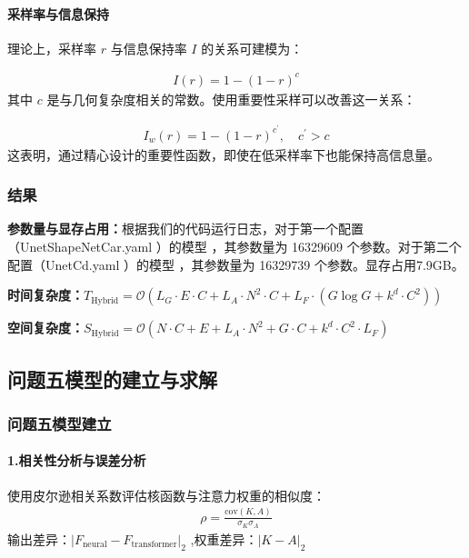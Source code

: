 \documentclass{MMCStyle}
\begin{document}
    
        \paragraph{采样率与信息保持}

理论上，采样率 $r$ 与信息保持率 $I$ 的关系可建模为：  


    \begin{eqnarray} 
    I(r)=1-(1-r)^{c}
    \end{eqnarray}
其中 $c$ 是与几何复杂度相关的常数。使用重要性采样可以改善这一关系：  

    \begin{eqnarray} 
    I_{w}(r)=1-(1-r)^{c^{\prime}},\quad c^{\prime}>c
    \end{eqnarray}
这表明，通过精心设计的重要性函数，即使在低采样率下也能保持高信息量。


\subsubsection{结果}



\textbf{参数量与显存占用：}根据我们的代码运行日志，对于第一个配置（UnetShapeNetCar.yaml ）的模型 ，其参数量为 16329609 个参数。对于第二个配置（UnetCd.yaml ）的模型 ，其参数量为 16329739 个参数。显存占用7.9GB。

\textbf{时间复杂度：}$T_{\mathrm{Hybrid}}=\mathcal{O}(L_{G}\cdot E\cdot C+L_{A}\cdot N^{2}\cdot C+L_{F}\cdot(G\log G+k^{d}\cdot C^{2}))$

\textbf{空间复杂度：}$S_{\mathrm{Hybrid}}=\mathcal{O}(N\cdot C+E+L_{A}\cdot N^{2}+G\cdot C+k^{d}\cdot C^{2}\cdot L_{F})$



	\subsection{问题五模型的建立与求解}
            \subsubsection{问题五模型建立}
                \paragraph{1.相关性分析与误差分析}
使用皮尔逊相关系数评估核函数与注意力权重的相似度：
    \begin{eqnarray} 
    \rho = \frac{\text{cov}(K, A)}{\sigma_K \sigma_A}
    \end{eqnarray}
输出差异：$|F_{\text{neural}} - F_{\text{transformer}}|_2$
,权重差异：$|K - A|_2$
\end{document}
